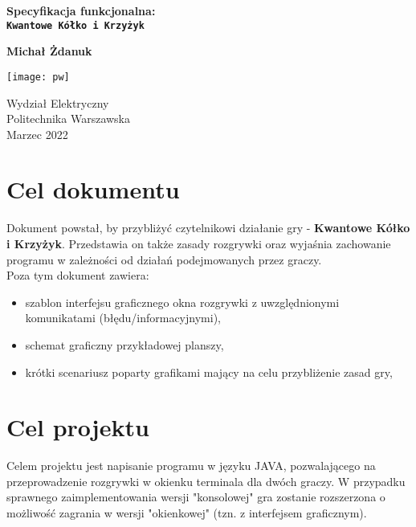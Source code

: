 \documentclass{article}
\begin{document}
\begin{titlepage}
   \begin{center}
        \vspace*{1cm}
        \Large    
        \textbf{Specyfikacja funkcjonalna:\\ \texttt{Kwantowe Kółko i Krzyżyk}} 
            
        \vspace{1.5cm}

       \textbf{Michał Żdanuk}

       \vfill
            
       \vspace{0.8cm}
     
       \texttt{[image: pw]}
            
       Wydział Elektryczny\\
       Politechnika Warszawska\\
       Marzec 2022\\
       \vspace{0.8cm}
        \small

   \end{center}
   
\end{titlepage}
\newpage
\setcounter{page}{2}
\section{Cel dokumentu}
Dokument powstał, by przybliżyć czytelnikowi działanie gry - \textbf{Kwantowe Kółko i Krzyżyk}. Przedstawia on także zasady rozgrywki oraz wyjaśnia zachowanie programu w zależności od działań podejmowanych przez graczy. \\

Poza tym dokument zawiera: 
\begin{itemize}
    \item szablon interfejsu graficznego okna rozgrywki z uwzględnionymi komunikatami (błędu/informacyjnymi),
    \item schemat graficzny przykładowej planszy,
    \item krótki scenariusz poparty grafikami mający na celu przybliżenie zasad gry,
\end{itemize}

\section{Cel projektu}

Celem projektu jest napisanie programu w języku JAVA, pozwalającego na przeprowadzenie rozgrywki w okienku terminala dla dwóch graczy. W przypadku sprawnego zaimplementowania wersji "konsolowej" gra zostanie rozszerzona o możliwość zagrania w wersji "okienkowej" (tzn. z interfejsem graficznym).\\
\end{document}
